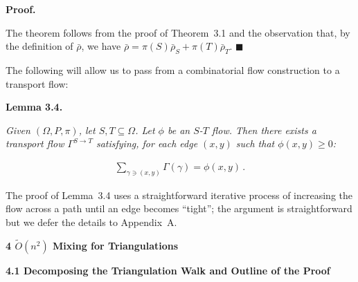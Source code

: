 \par\medskip\noindent\textbf{Proof.}\par



The theorem follows from the proof of Theorem 3.1 and the observation that, by the definition of $\bar{\rho}$, we have
$\bar{\rho}=\pi(S)\bar{\rho}_{S}+\pi(T)\bar{\rho}_{T}$.
\ensuremath{\blacksquare}\par





The following will allow us to pass from a combinatorial flow construction to a transport flow:\par





\par\medskip\noindent\textbf{\textbf{Lemma 3.4}\textbf{.}}\par



\emph{Given $(\Omega,P,\pi)$, let $S,T\subseteq\Omega$. Let $\phi$ be an $S$-$T$ flow. Then there exists a transport flow $\Gamma^{S\rightarrow T}$ satisfying, for each edge $(x,y)$ such that $\phi(x,y)\geq 0$:}\par




\[\begin{gathered}
\sum_{\gamma\ni(x,y)}\Gamma(\gamma)=\phi(x,y)\,.
\end{gathered}\]






The proof of Lemma 3.4 uses a straightforward iterative process of increasing the flow across a path until an edge becomes “tight”; the argument is straightforward but we defer the details to Appendix A.\par





\par\medskip\noindent\textbf{4 $\widetilde{O}(n^{2})$ Mixing for Triangulations}\par




\par\medskip\noindent\textbf{4.1 Decomposing the Triangulation Walk and Outline of the Proof}\par




